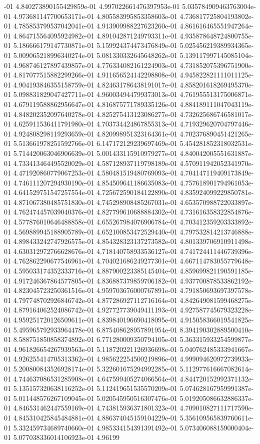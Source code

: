 -01	4.840273890155429859e-01	4.997022661476397953e-01	5.035784909463763004e-01	4.973681147700653171e-01	4.805583995853358603e-01	4.736817725804193802e-01	4.785853799537042041e-01	4.913909988227623260e-01	4.861616465551947264e-01	4.864715564095924982e-01	4.891042871249793311e-01	4.935878648724800755e-01	5.186666179147730871e-01	5.159924374473476849e-01	5.025456219389934365e-01	5.009065218996340274e-01	5.081330332645648262e-01	5.139117997145085104e-01	4.968746127897439857e-01	4.776334082161224903e-01	4.731852075396751900e-01	4.817077515882299266e-01	4.911656524142298808e-01	4.945822821111011125e-01	4.904193846355158759e-01	4.824631786438191017e-01	4.858201618269495370e-01	5.098831829047427711e-01	4.960034944799373013e-01	4.761955513175006871e-01	4.679119588862956647e-01	4.816875771789335126e-01	4.884189111047043119e-01	4.848202352097640278e-01	4.825275413123086277e-01	4.732625686746581017e-01	4.625911536411791980e-01	4.703734424867855313e-01	4.719329620704797446e-01	4.924808298119293659e-01	4.820998951323164361e-01	4.702376890451421265e-01	5.513661978251592766e-01	6.147172129239697469e-01	5.454281852318032531e-01	5.714420063046906639e-01	5.001433115910979277e-01	4.840042005551631887e-01	4.733413464495520029e-01	4.587128937119798189e-01	4.570911942052341970e-01	4.471920860779067253e-01	4.580481519480769093e-01	4.704147119409173849e-01	4.746111207294930190e-01	4.854509641186635083e-01	4.757618901794961053e-01	4.641529751547257554e-01	4.725672590184122890e-01	4.835924099229850781e-01	4.871067380485751830e-01	4.745298908485267031e-01	4.653570988722033897e-01	4.762474457039040376e-01	4.827799610688884302e-01	4.731616358322854876e-01	4.577876010646488858e-01	4.655267984076906784e-01	4.703412359203333892e-01	4.569889945188905789e-01	4.652100853472529440e-01	4.797532814213746888e-01	4.898433242747926575e-01	4.854328323137273582e-01	4.801339706910911498e-01	4.630312972766628676e-01	4.718140758933536127e-01	4.741724411446739396e-01	4.762862290677546961e-01	4.704021686249277301e-01	4.667114783055779648e-01	4.595033174352333716e-01	4.887900223385145404e-01	4.859699821190591185e-01	4.917246367864577805e-01	4.836887379859706182e-01	4.937700878533862192e-01	4.823045723250361516e-01	4.959703676000767891e-01	4.791850693697397578e-01	4.797748702926846742e-01	4.877286927112716164e-01	4.842649081599468275e-01	4.879164062524086742e-01	4.927727739049411193e-01	4.927587745679323228e-01	4.959251720126509611e-01	4.839840196690418095e-01	4.915058366019541825e-01	5.495965792933964478e-01	6.875408628957891954e-01	8.394190302889500410e-01	8.588751850858374892e-01	6.771280009350794105e-01	5.363315933254599877e-01	4.961826654267939563e-01	5.118720221126936698e-01	5.040762485333941667e-01	4.926255414705313362e-01	4.985622254500219896e-01	4.999094620972739933e-01	5.200800843526928174e-01	5.322601675294992285e-01	5.112977616667082614e-01	4.744637086531285908e-01	4.647599405274066564e-01	4.844720152992371132e-01	5.135157320638116252e-01	5.112419651535570209e-01	5.074628167959991387e-01	5.011448576267109045e-01	5.020545950516307476e-01	5.019205086632886337e-01	4.846531462447559169e-01	4.743815936371801323e-01	4.709010827111717590e-01	4.845310425845484881e-01	4.886374045159104229e-01	5.356109565839760611e-01	5.332459734689740660e-01	4.985334154391391492e-01	5.073406088159000404e-01	5.077038336014106923e-01	4.96199